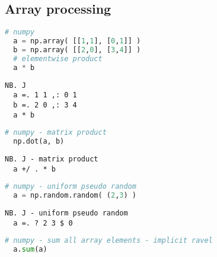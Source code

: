 \subsection*{Array processing}

\begin{lstlisting}[language=python, frame=single, framerule=0pt, basicstyle=\ttfamily\normalsize, keywordstyle=\bfseries\color{keywcolor}\normalsize]
  # numpy 
  a = np.array( [[1,1], [0,1]] ) 
  b = np.array( [[2,0], [3,4]] ) 
  # elementwise product 
  a * b
\end{lstlisting}

\begin{lstlisting}[language=jdoc, frame=single, framerule=0pt, basicstyle=\ttfamily\normalsize, keywordstyle=\bfseries\color{keywcolor}\normalsize] 
  NB. J 
  a =. 1 1 ,: 0 1 
  b =. 2 0 ,: 3 4 
  a * b
\end{lstlisting}

\begin{lstlisting}[language=python, frame=single, framerule=0pt, basicstyle=\ttfamily\normalsize, keywordstyle=\bfseries\color{keywcolor}\normalsize]
  # numpy - matrix product 
  np.dot(a, b)
\end{lstlisting}

\begin{lstlisting}[language=jdoc, frame=single, framerule=0pt, basicstyle=\ttfamily\normalsize, keywordstyle=\bfseries\color{keywcolor}\normalsize] 
  NB. J - matrix product 
  a +/ . * b   
\end{lstlisting} 
  
\begin{lstlisting}[language=python, frame=single, framerule=0pt, basicstyle=\ttfamily\normalsize, keywordstyle=\bfseries\color{keywcolor}\normalsize]
  # numpy - uniform pseudo random 
  a = np.random.random( (2,3) )  
\end{lstlisting}

\begin{lstlisting}[language=jdoc, frame=single, framerule=0pt, basicstyle=\ttfamily\normalsize, keywordstyle=\bfseries\color{keywcolor}\normalsize]   
  NB. J - uniform pseudo random 
  a =. ? 2 3 $ 0  
\end{lstlisting}
  
\begin{lstlisting}[language=python, frame=single, framerule=0pt, basicstyle=\ttfamily\normalsize, keywordstyle=\bfseries\color{keywcolor}\normalsize]
  # numpy - sum all array elements - implicit ravel 
  a.sum(a)  
\end{lstlisting}

